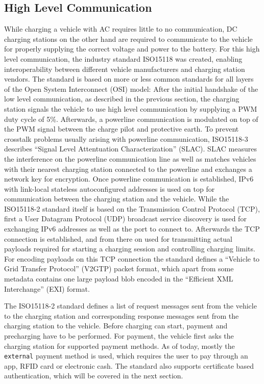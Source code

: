 \documentclass[conference,flushend]{iaria} %
\begin{document}
\subsection{High Level Communication} \label{sec:highlevelcomm}
While charging a vehicle with AC requires little to no communication,
DC charging stations on the other hand are required to communicate to the vehicle for properly supplying the correct voltage and power to the battery.
For this high level communication, the industry standard ISO15118 \cite{isoiec_isoiec_2012} was created, enabling interoperability between different vehicle manufacturers and charging station vendors.
The standard is based on more or less common standards for all layers of the Open System Interconnect (OSI) model:
After the initial handshake of the low level communication, as described in the previous section, the charging station signals the vehicle to use high level communication by supplying a PWM duty cycle of 5\%.
Afterwards, a powerline communication is modulated on top of the PWM signal between the charge pilot and protective earth.
To prevent crosstalk problems \cite{li_crosstalk_2019, theethayi_parameters_2003, ngo_bisse_crosstalk_2023} usually arising with powerline communication, ISO15118-3 \cite{isoiec_isoiec_2012-1} describes \enquote{Signal Level Attentuation Characterization} (SLAC).
SLAC measures the interference on the powerline communication line as well as matches vehicles with their nearest charging station connected to the powerline and exchanges a network key for encryption.
Once powerline communication is established, IPv6 with link-local stateless autoconfigured addresses is used on top for communication between the charging station and the vehicle.
While the ISO15118-2 standard \cite{isoiec_isoiec_2012} itself is based on the Transmission Control Protocol (TCP), first a User Datagram Protocol
(UDP) broadcast service discovery is used for exchanging IPv6 addresses as well as the port to connect to.
Afterwards the TCP connection is established, and from there on used for transmitting actual payloads required for starting a charging session and controlling charging limits.
For encoding payloads on this TCP connection the standard defines a \enquote{Vehicle to Grid Transfer Protocol} (V2GTP) packet format, which apart from some metadata contains one large payload blob encoded in the \enquote{Efficient XML Interchange} (EXI) format.

The ISO15118-2 standard defines a list of request messages sent from the vehicle to the charging station and corresponding response messages sent from the charging station to the vehicle.
Before charging can start, payment and precharging have to be performed.
For payment, the vehicle first asks the charging station for supported payment methods.
As of today, mostly the \verb'external' payment method is used, which requires the user to pay through an app, RFID card or electronic cash.
The standard also supports certificate based authentication, which will be covered in the next section.
\end{document}
